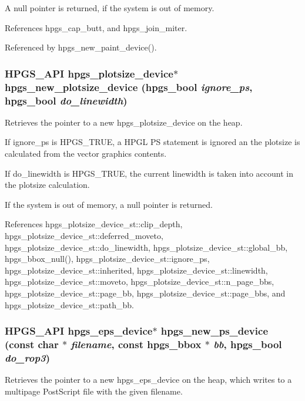 A null pointer is returned, if the system is out of memory. 

References hpgs\_\-cap\_\-butt, and hpgs\_\-join\_\-miter.



Referenced by hpgs\_\-new\_\-paint\_\-device().

\subsubsection[{hpgs\_\-new\_\-plotsize\_\-device}]{\setlength{\rightskip}{0pt plus 5cm}HPGS\_\-API {\bf hpgs\_\-plotsize\_\-device}$\ast$ hpgs\_\-new\_\-plotsize\_\-device (hpgs\_\-bool {\em ignore\_\-ps}, \/  hpgs\_\-bool {\em do\_\-linewidth})}\label{group__device_gadd6dbaffaf1e09f9c771cbf60eb45e3f}
Retrieves the pointer to a new {\ttfamily hpgs\_\-plotsize\_\-device} on the heap.

If {\ttfamily ignore\_\-ps} is {\ttfamily HPGS\_\-TRUE}, a HPGL PS statement is ignored an the plotsize is calculated from the vector graphics contents.

If {\ttfamily do\_\-linewidth} is {\ttfamily HPGS\_\-TRUE}, the current linewidth is taken into account in the plotsize calculation.

If the system is out of memory, a null pointer is returned. 

References hpgs\_\-plotsize\_\-device\_\-st::clip\_\-depth, hpgs\_\-plotsize\_\-device\_\-st::deferred\_\-moveto, hpgs\_\-plotsize\_\-device\_\-st::do\_\-linewidth, hpgs\_\-plotsize\_\-device\_\-st::global\_\-bb, hpgs\_\-bbox\_\-null(), hpgs\_\-plotsize\_\-device\_\-st::ignore\_\-ps, hpgs\_\-plotsize\_\-device\_\-st::inherited, hpgs\_\-plotsize\_\-device\_\-st::linewidth, hpgs\_\-plotsize\_\-device\_\-st::moveto, hpgs\_\-plotsize\_\-device\_\-st::n\_\-page\_\-bbs, hpgs\_\-plotsize\_\-device\_\-st::page\_\-bb, hpgs\_\-plotsize\_\-device\_\-st::page\_\-bbs, and hpgs\_\-plotsize\_\-device\_\-st::path\_\-bb.

\subsubsection[{hpgs\_\-new\_\-ps\_\-device}]{\setlength{\rightskip}{0pt plus 5cm}HPGS\_\-API {\bf hpgs\_\-eps\_\-device}$\ast$ hpgs\_\-new\_\-ps\_\-device (const char $\ast$ {\em filename}, \/  const {\bf hpgs\_\-bbox} $\ast$ {\em bb}, \/  hpgs\_\-bool {\em do\_\-rop3})}\label{group__device_ga8fc4def644785c7762e048a26b12e29a}
Retrieves the pointer to a new {\ttfamily hpgs\_\-eps\_\-device} on the heap, which writes to a multipage PostScript file with the given {\ttfamily filename}.

